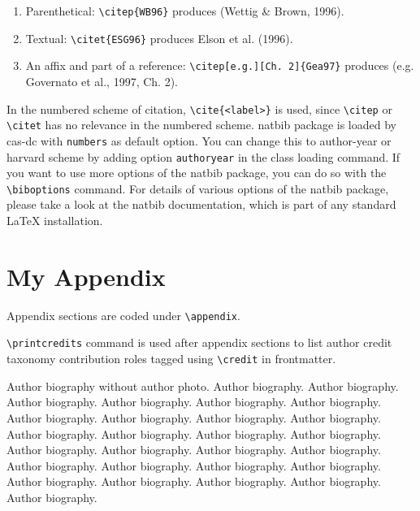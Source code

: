 \documentclass[a4paper,fleqn]{cas-dc}
\begin{document}
\begin{enumerate}[\textbullet]
\item Parenthetical: \verb+\citep{WB96}+ produces (Wettig \& Brown, 1996).
\item Textual: \verb+\citet{ESG96}+ produces Elson et al. (1996).
\item An affix and part of a reference:\break
\verb+\citep[e.g.][Ch. 2]{Gea97}+ produces (e.g. Governato et
al., 1997, Ch. 2).
\end{enumerate}

In the numbered scheme of citation, \verb+\cite{<label>}+ is used,
since \verb+\citep+ or \verb+\citet+ has no relevance in the numbered
scheme.  {natbib} package is loaded by {cas-dc} with
\verb+numbers+ as default option.  You can change this to author-year
or harvard scheme by adding option \verb+authoryear+ in the class
loading command.  If you want to use more options of the {natbib}
package, you can do so with the \verb+\biboptions+ command.  For
details of various options of the {natbib} package, please take a
look at the {natbib} documentation, which is part of any standard
\LaTeX{} installation.

\appendix
\section{My Appendix}
Appendix sections are coded under \verb+\appendix+.

\verb+\printcredits+ command is used after appendix sections to list 
author credit taxonomy contribution roles tagged using \verb+\credit+ 
in frontmatter.

\printcredits

%






\bio{}
Author biography without author photo.
Author biography. Author biography. Author biography.
Author biography. Author biography. Author biography.
Author biography. Author biography. Author biography.
Author biography. Author biography. Author biography.
Author biography. Author biography. Author biography.
Author biography. Author biography. Author biography.
Author biography. Author biography. Author biography.
Author biography. Author biography. Author biography.
Author biography. Author biography. Author biography.
\endbio
\end{document}
